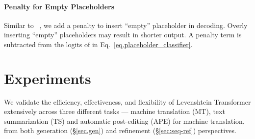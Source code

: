 \documentclass{article}
\newcommand{\secref}[1]{\S\ref{#1}}
\begin{document}
\paragraph{Penalty for Empty Placeholders} 
Similar to ~\citet{stern2019insertion}, we add a penalty to insert ``empty'' placeholder in decoding. Overly inserting ``empty'' placeholders may result in shorter output. A penalty term  is subtracted from the logits of  in Eq.~\eqref{eq.placeholder_classifier}.



\section{Experiments}
We validate the efficiency, effectiveness, and flexibility of Levenshtein Transformer extensively across three different tasks --- machine translation (MT), text summarization (TS) and automatic post-editing (APE) for machine translation, from both generation (\secref{sec.gen}) and refinement (\secref{sec:seq-ref}) perspectives.
\end{document}
